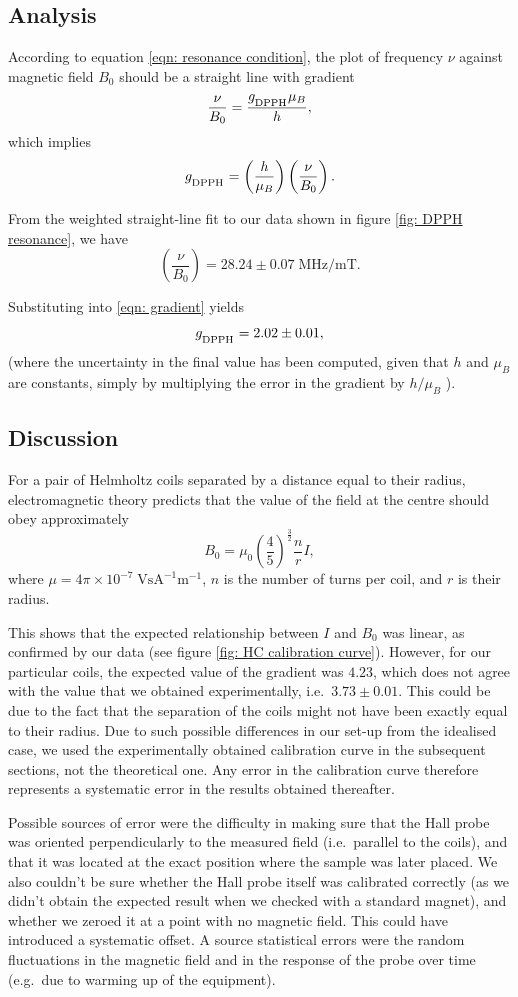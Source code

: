\documentclass[a4paper]{jpconf}
\numberwithin{equation}{section}
\begin{document}
\subsection{Analysis}
According to equation \eqref{eqn: resonance condition}, the plot of frequency $\nu$ against magnetic field $B_0$ should be a straight line with gradient 
\[
	\frac{\nu}{B_0} = \frac{g_{\textsubscript{DPPH}} \mu_B}{h},
\]
which implies
\begin{equation} \label{eqn: gradient}
	g_{\textsubscript{DPPH}} = \left(\frac{h}{\mu_B}\right) \left(\frac{\nu}{B_0}\right). 
\end{equation}
	
From the weighted straight-line fit to our data shown in figure \ref{fig: DPPH resonance}, we have
\[
	\left(\frac{\nu}{B_0}\right) = 28.24 \pm 0.07 \; \si{\mega\hertz\per\milli\tesla}.
\]

Substituting into \eqref{eqn: gradient} yields 
\[
	g_{\textsubscript{DPPH}} = 2.02 \pm 0.01,
\] 
(where the uncertainty in the final value has been computed, given that $h$ and $\mu_B$ are constants, simply by multiplying the error in the gradient by $h / \mu_B$ ).

\subsection{Discussion}
For a pair of Helmholtz coils separated by a distance equal to their radius, electromagnetic theory predicts that the value of the field at the centre should obey approximately
\[
	B_0 = \mu_0 \left(\frac45\right)^{\tfrac32} \frac{n}{r} I,
\]
where $\mu = 4\pi\times10^{-7} \; \si{\volt\s\ampere\tothe{-1}\meter\tothe{-1}}$, $n$ is the number of turns per coil, and $r$ is their radius.

This shows that the expected relationship between $I$ and $B_0$ was linear, as confirmed by our data (see figure \ref{fig: HC calibration curve}).
However, for our particular coils, the expected value of the gradient was $4.23$, which does not agree with the value that we obtained experimentally, i.e.\ $3.73 \pm 0.01$. This could be due to the fact that the separation of the coils might not have been exactly equal to their radius. Due to such possible differences in our set-up from the idealised case, we used the experimentally obtained calibration curve in the subsequent sections, not the theoretical one. Any error in the calibration curve therefore represents a systematic error in the results obtained thereafter.

Possible sources of error were the difficulty in making sure that the Hall probe was oriented perpendicularly to the measured field (i.e.\ parallel to the coils), and that it was located at the exact position where the sample was later placed. We also couldn't be sure whether the Hall probe itself was calibrated correctly (as we didn't obtain the expected result when we checked with a standard magnet), and whether we zeroed it at a point with no magnetic field. This could have introduced a systematic offset. A source statistical errors were the random fluctuations in the magnetic field and in the response of the probe over time (e.g.\ due to warming up of the equipment).
\end{document}
